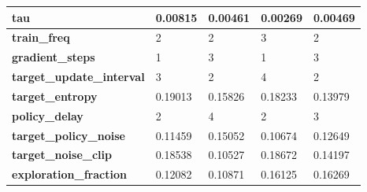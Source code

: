 \documentclass[../xlapes02]{subfiles}
\begin{document}
\begin{table}[h!]
{\begin{tabular}{|l||l|l||l|l|}
                \textbf{tau}                       & 0.00815                                      & 0.00461                                      & 0.00269                                      & 0.00469                                      \\ \hline
                \textbf{train\_freq}               & 2                                            & 2                                            & 3                                            & 2                                            \\ \hline
                \textbf{gradient\_steps}           & 1                                            & 3                                            & 1                                            & 3                                            \\ \hline
                \textbf{target\_update\_interval}  & 3                                            & 2                                            & 4                                            & 2                                            \\ \hline
                \textbf{target\_entropy}           & 0.19013                                      & 0.15826                                      & 0.18233                                      & 0.13979                                      \\ \hline
                \textbf{policy\_delay}             & 2                                            & 4                                            & 2                                            & 3                                            \\ \hline
                \textbf{target\_policy\_noise}     & 0.11459                                      & 0.15052                                      & 0.10674                                      & 0.12649                                      \\ \hline
                \textbf{target\_noise\_clip}       & 0.18538                                      & 0.10527                                      & 0.18672                                      & 0.14197                                      \\ \hline
                \textbf{exploration\_fraction}     & 0.12082                                      & 0.10871                                      & 0.16125                                      & 0.16269                                      \\ \hline

\end{tabular}}
\end{table}
\end{document}
